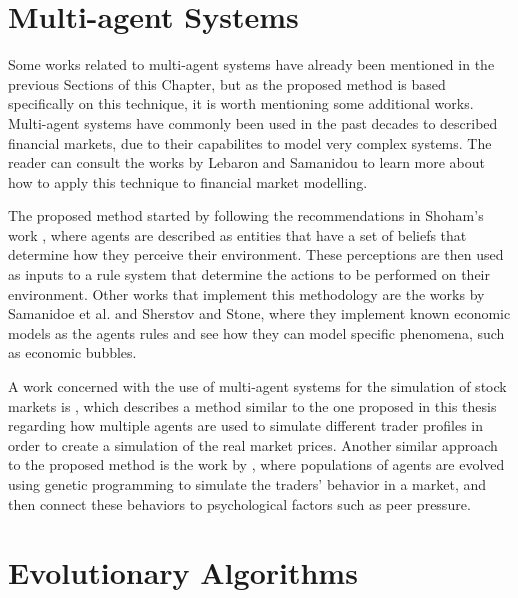 \section{Multi-agent Systems}
\label{section:multi-agent-systems}

Some works related to multi-agent systems have already been mentioned in the
previous Sections of this Chapter, but as the proposed method is based
specifically on this technique, it is worth mentioning some additional
works. Multi-agent systems have commonly been used in the past decades to
described financial markets, due to their capabilites to model very complex
systems. The reader can consult the works by Lebaron \cite{Lebaron2001} and
Samanidou \cite{Bundesbank2007} to learn more about how to apply this technique
to financial market modelling.

The proposed method started by following the recommendations in Shoham's work
\cite{Shoham1993} \cite{Shoham2009}, where agents are described as entities that
have a set of beliefs that determine how they perceive their environment. These
perceptions are then used as inputs to a rule system that determine the actions
to be performed on their environment. Other works that implement this
methodology are the works by Samanidoe et al. \cite{Bundesbank2007} and Sherstov
and Stone\cite{Sherstov2005}, where they implement known economic models as the
agents rules and see how they can model specific phenomena, such as economic
bubbles.

A work concerned with the use of multi-agent systems for the simulation of stock
markets is \cite{Kendall2003}, which describes a method similar to the one
proposed in this thesis regarding how multiple agents are used to simulate
different trader profiles in order to create a simulation of the real market
prices. Another similar approach to the proposed method is the work by
\cite{Chen2001}, where populations of agents are evolved using genetic
programming to simulate the traders' behavior in a market, and then connect
these behaviors to psychological factors such as peer pressure.

\section{Evolutionary Algorithms}
\label{section:evolutionary-algorithms}

